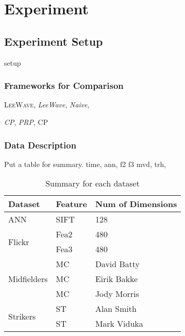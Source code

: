 \chapter{Experiment}
\label{c:exp}

\section{Experiment Setup} %
\label{s:experiment_setup}
setup~

\subsection{Frameworks for Comparison} %
\label{sub:frameworks_for_comparison}


\textsc{LeeWave},
\emph{LeeWave},
\emph{Naive},

\emph{CP},
\emph{PRP},
\textsc{CP}


\subsection{Data Description} %
\label{ss:data_description}
Put a table for summary.
time,
ann,
f2
f3
mvd,
trh,
\begin{table}[htpb]\begin{center}
\caption{Summary for each dataset}
\begin{tabular}{|l|l|l|}
\hline
Dataset & Feature & Num of Dimensions \\ \hline
ANN & SIFT & 128 \\ \hline
\multirow{2}{*}{Flickr} & Fea2 & 480 \\
 & Fea3 & 480 \\ \hline
\multirow{3}{*}{Midfielders} & MC & David Batty \\
 & MC & Eirik Bakke \\
 & MC & Jody Morris \\ \hline
\multirow{2}{*}{Strikers} & ST & Alan Smith \\
 & ST & Mark Viduka \\
\hline
\end{tabular}
 \end{center}\end{table}



